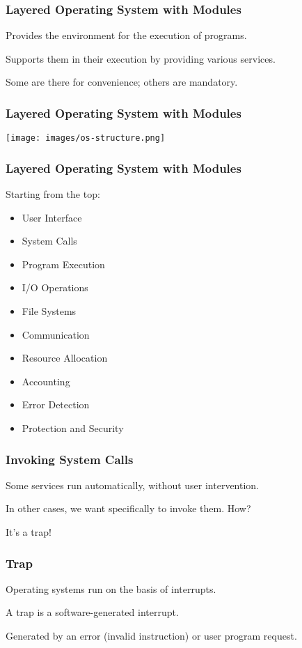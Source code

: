 \begin{frame}
\frametitle{Layered Operating System with Modules}

Provides the environment for the execution of programs.

Supports them in their execution by providing various services.

Some are there for convenience; others are mandatory.

\end{frame}

\begin{frame}
\frametitle{Layered Operating System with Modules}

\begin{center}
\texttt{[image: images/os-structure.png]}
\end{center}

\end{frame}


\begin{frame}
\frametitle{Layered Operating System with Modules}

Starting from the top:

\begin{itemize}
	\item User Interface
	\item System Calls
	\item Program Execution
	\item I/O Operations
	\item File Systems
	\item Communication
	\item Resource Allocation
	\item Accounting
	\item Error Detection
	\item Protection and Security
\end{itemize}


\end{frame}

\begin{frame}
\frametitle{Invoking System Calls}

Some services run automatically, without user intervention.

In other cases, we want specifically to invoke them. How?

It's a trap!

\end{frame}

\begin{frame}
\frametitle{Trap}

Operating systems run on the basis of interrupts.

A \alert{trap} is a software-generated interrupt.

Generated by an error (invalid instruction) or user program request.

\end{frame}

